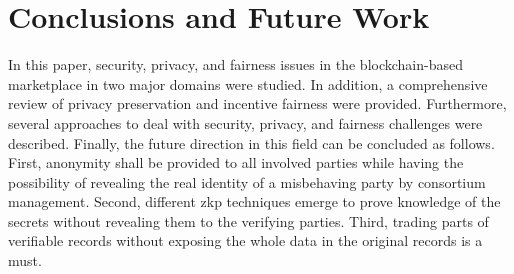 \section{Conclusions and Future Work}
\label{sec:conclusions}
In this paper, security, privacy, and fairness issues in the blockchain-based marketplace in two major domains were studied.
In addition, a comprehensive review of privacy preservation and incentive fairness were provided.
Furthermore, several approaches to deal with security, privacy, and fairness challenges were described.
Finally, the future direction in this field can be concluded as follows.
First, anonymity shall be provided to all involved parties while having the possibility of revealing the real identity of a misbehaving party by consortium management.
Second, different \ac{zkp} techniques emerge to prove knowledge of the secrets without revealing them to the verifying parties.
Third, trading parts of verifiable records without exposing the whole data in the original records is a must.
